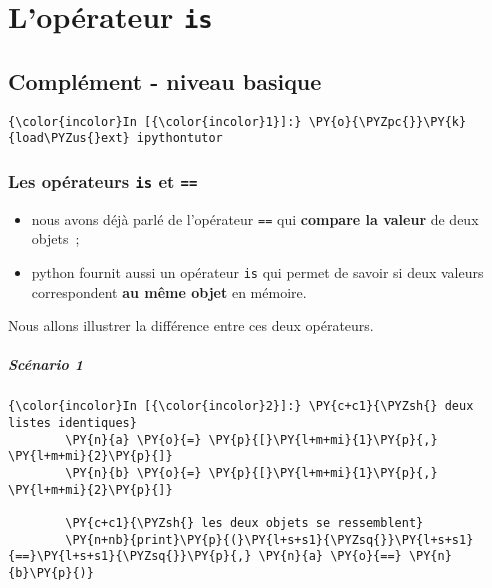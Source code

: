     
    
    
    

    

    \hypertarget{lopuxe9rateur-is}{%
\section{\texorpdfstring{L'opérateur
\texttt{is}}{L'opérateur is}}\label{lopuxe9rateur-is}}

    \hypertarget{compluxe9ment---niveau-basique}{%
\subsection{Complément - niveau
basique}\label{compluxe9ment---niveau-basique}}

    \begin{Verbatim}[commandchars=\\\{\},frame=single,framerule=0.3mm,rulecolor=\color{cellframecolor}]
{\color{incolor}In [{\color{incolor}1}]:} \PY{o}{\PYZpc{}}\PY{k}{load\PYZus{}ext} ipythontutor
\end{Verbatim}


    \hypertarget{les-opuxe9rateurs-is-et}{%
\subsubsection{\texorpdfstring{Les opérateurs \texttt{is} et
\texttt{==}}{Les opérateurs is et ==}}\label{les-opuxe9rateurs-is-et}}

    \begin{itemize}
\tightlist
\item
  nous avons déjà parlé de l'opérateur \texttt{==} qui \textbf{compare
  la valeur} de deux objets~;
\item
  python fournit aussi un opérateur \texttt{is} qui permet de savoir si
  deux valeurs correspondent \textbf{au même objet} en mémoire.
\end{itemize}

Nous allons illustrer la différence entre ces deux opérateurs.

    \hypertarget{scuxe9nario-1}{%
\subparagraph{Scénario 1}\label{scuxe9nario-1}}

    \begin{Verbatim}[commandchars=\\\{\},frame=single,framerule=0.3mm,rulecolor=\color{cellframecolor}]
{\color{incolor}In [{\color{incolor}2}]:} \PY{c+c1}{\PYZsh{} deux listes identiques}
        \PY{n}{a} \PY{o}{=} \PY{p}{[}\PY{l+m+mi}{1}\PY{p}{,} \PY{l+m+mi}{2}\PY{p}{]}
        \PY{n}{b} \PY{o}{=} \PY{p}{[}\PY{l+m+mi}{1}\PY{p}{,} \PY{l+m+mi}{2}\PY{p}{]}
        
        \PY{c+c1}{\PYZsh{} les deux objets se ressemblent}
        \PY{n+nb}{print}\PY{p}{(}\PY{l+s+s1}{\PYZsq{}}\PY{l+s+s1}{==}\PY{l+s+s1}{\PYZsq{}}\PY{p}{,} \PY{n}{a} \PY{o}{==} \PY{n}{b}\PY{p}{)}
\end{Verbatim}


